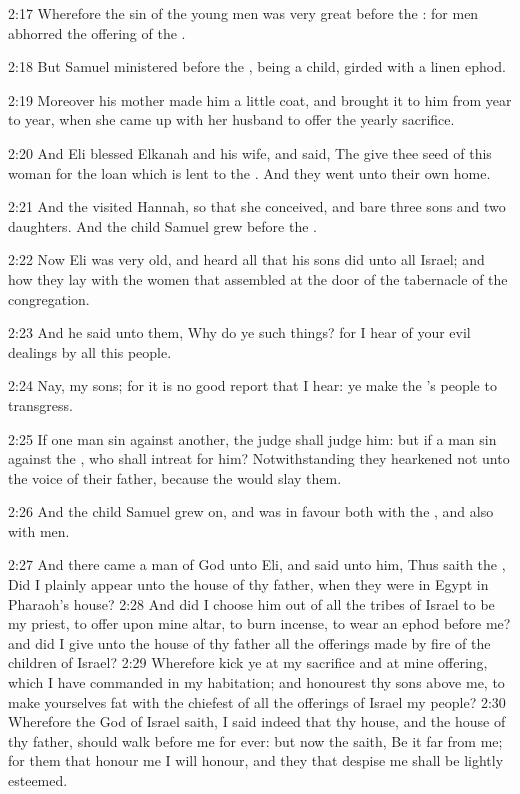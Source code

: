 2:17 Wherefore the sin of the young men was very great before the
\LORD: for men abhorred the offering of the \LORD.

2:18 But Samuel ministered before the \LORD, being a child, girded with
a linen ephod.

2:19 Moreover his mother made him a little coat, and brought it to him
from year to year, when she came up with her husband to offer the
yearly sacrifice.

2:20 And Eli blessed Elkanah and his wife, and said, The \LORD give
thee seed of this woman for the loan which is lent to the \LORD. And
they went unto their own home.

2:21 And the \LORD visited Hannah, so that she conceived, and bare
three sons and two daughters. And the child Samuel grew before the
\LORD.

2:22 Now Eli was very old, and heard all that his sons did unto all
Israel; and how they lay with the women that assembled at the door of
the tabernacle of the congregation.

2:23 And he said unto them, Why do ye such things? for I hear of your
evil dealings by all this people.

2:24 Nay, my sons; for it is no good report that I hear: ye make the
\LORD's people to transgress.

2:25 If one man sin against another, the judge shall judge him: but if
a man sin against the \LORD, who shall intreat for him? Notwithstanding
they hearkened not unto the voice of their father, because the \LORD
would slay them.

2:26 And the child Samuel grew on, and was in favour both with the
\LORD, and also with men.

2:27 And there came a man of God unto Eli, and said unto him, Thus
saith the \LORD, Did I plainly appear unto the house of thy father,
when they were in Egypt in Pharaoh's house?  2:28 And did I choose him
out of all the tribes of Israel to be my priest, to offer upon mine
altar, to burn incense, to wear an ephod before me? and did I give
unto the house of thy father all the offerings made by fire of the
children of Israel?  2:29 Wherefore kick ye at my sacrifice and at
mine offering, which I have commanded in my habitation; and honourest
thy sons above me, to make yourselves fat with the chiefest of all the
offerings of Israel my people?  2:30 Wherefore the \LORD God of Israel
saith, I said indeed that thy house, and the house of thy father,
should walk before me for ever: but now the \LORD saith, Be it far from
me; for them that honour me I will honour, and they that despise me
shall be lightly esteemed.

